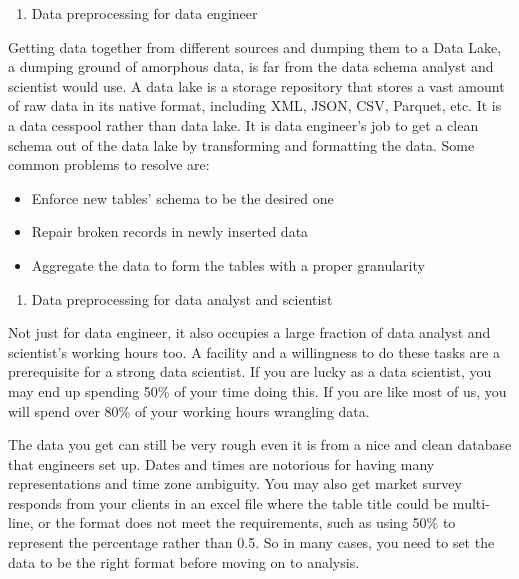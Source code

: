 \documentclass[12pt,]{krantz}
\providecommand{\tightlist}{%
  \setlength{\itemsep}{0pt}\setlength{\parskip}{0pt}}
\theoremstyle{definition}
\theoremstyle{definition}
\theoremstyle{definition}
\theoremstyle{remark}
\begin{document}
\begin{enumerate}
\def\labelenumi{(\arabic{enumi})}
\tightlist
\item
  Data preprocessing for data engineer
\end{enumerate}

Getting data together from different sources and dumping them to a Data
Lake, a dumping ground of amorphous data, is far from the data schema
analyst and scientist would use. A data lake is a storage repository
that stores a vast amount of raw data in its native format, including
XML, JSON, CSV, Parquet, etc. It is a data cesspool rather than data
lake. It is data engineer's job to get a clean schema out of the data
lake by transforming and formatting the data. Some common problems to
resolve are:

\begin{itemize}
\tightlist
\item
  Enforce new tables' schema to be the desired one
\item
  Repair broken records in newly inserted data
\item
  Aggregate the data to form the tables with a proper granularity
\end{itemize}

\begin{enumerate}
\def\labelenumi{(\arabic{enumi})}
\setcounter{enumi}{1}
\tightlist
\item
  Data preprocessing for data analyst and scientist
\end{enumerate}

Not just for data engineer, it also occupies a large fraction of data
analyst and scientist's working hours too. A facility and a willingness
to do these tasks are a prerequisite for a strong data scientist. If you
are lucky as a data scientist, you may end up spending 50\% of your time
doing this. If you are like most of us, you will spend over 80\% of your
working hours wrangling data.

The data you get can still be very rough even it is from a nice and
clean database that engineers set up. Dates and times are notorious for
having many representations and time zone ambiguity. You may also get
market survey responds from your clients in an excel file where the
table title could be multi-line, or the format does not meet the
requirements, such as using 50\% to represent the percentage rather than
0.5. So in many cases, you need to set the data to be the right format
before moving on to analysis.
\end{document}
